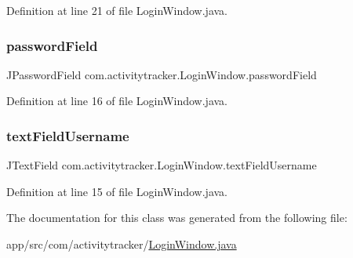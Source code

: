 Definition at line 21 of file Login\+Window.\+java.

\mbox{\label{classcom_1_1activitytracker_1_1_login_window_ae53353ceea197fe7b93f1b7156112d08}} 
\subsubsection{\texorpdfstring{password\+Field}{passwordField}}
{\footnotesize\ttfamily J\+Password\+Field com.\+activitytracker.\+Login\+Window.\+password\+Field\hspace{0.3cm}{\ttfamily [private]}}



Definition at line 16 of file Login\+Window.\+java.

\mbox{\label{classcom_1_1activitytracker_1_1_login_window_aba181dcec114c349a67304406bcce92a}} 
\subsubsection{\texorpdfstring{text\+Field\+Username}{textFieldUsername}}
{\footnotesize\ttfamily J\+Text\+Field com.\+activitytracker.\+Login\+Window.\+text\+Field\+Username\hspace{0.3cm}{\ttfamily [private]}}



Definition at line 15 of file Login\+Window.\+java.



The documentation for this class was generated from the following file\+:\begin{DoxyCompactItemize}
\item 
app/src/com/activitytracker/\mbox{\hyperlink{_login_window_8java}{Login\+Window.\+java}}\end{DoxyCompactItemize}
